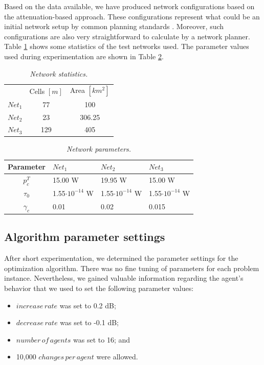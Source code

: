 Based on the data available, we have produced network configurations
based on the attenuation-based approach. These configurations represent
what could be an initial network setup by common planning standards
\cite{Holma_WCDMA.for.UMTS:2005}. Moreover, such configurations are
also very straightforward to calculate by a network planner. Table
\ref{tab:network-statistics-1} shows some statistics of the test
networks used. The parameter values used during experimentation are
shown in Table \ref{tab:network-parameters-1}.

\begin{table}
\caption{\textit{Network statistics.\label{tab:network-statistics-1}}}


\centering

\begin{tabular}{ccc}
\toprule 
 & Cells $[m]$ & Area $[km^{2}]$\tabularnewline\addlinespace
\midrule
$Net_{1}$ & 77 & 100\tabularnewline
$Net_{2}$ & 23 & 306.25\tabularnewline
$Net_{3}$ & 129 & 405\tabularnewline
\bottomrule
\end{tabular}
\end{table}


\begin{table}
\caption{\textit{Network parameters.\label{tab:network-parameters-1}}}


\centering

\begin{tabular}{clll}
\hline 
Parameter & $Net_{1}$ & $Net_{2}$ & $Net_{3}$\tabularnewline
\hline 
$p_{c}^{T}$ & 15.00 W & 19.95 W & 15.00 W\tabularnewline
$\tau_{0}$ & 1.55$\cdot10^{-14}$ W & 1.55$\cdot10^{-14}$ W & 1.55$\cdot10^{-14}$ W\tabularnewline
$\gamma_{c}$ & 0.01 & 0.02 & 0.015\tabularnewline
\hline 
\end{tabular}
\end{table}



\subsection{Algorithm parameter settings \label{sub:Algorithm-parameter-settings-1}}

After short experimentation, we determined the parameter settings
for the optimization algorithm. There was no fine tuning of parameters
for each problem instance. Nevertheless, we gained valuable information
regarding the agent's behavior that we used to set the following parameter
values:
\begin{itemize}
\item $increase\, rate$ was set to 0.2 dB;
\item $decrease\, rate$ was set to -0.1 dB;
\item $number\, of\, agents$ was set to 16; and
\item 10,000 $changes\, per\, agent$ were allowed.
\end{itemize}

